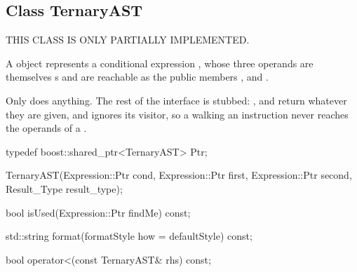 \subsection{Class TernaryAST}
\label{sec:TernaryAST}


THIS CLASS IS ONLY PARTIALLY IMPLEMENTED.

A  object represents a conditional expression
, whose three operands are themselves
s and are reachable as the public members ,
 and .

Only  does anything. The rest of the  interface
is stubbed: ,  and  return
 whatever they are given, and  ignores its visitor, so
a  walking an instruction never reaches the operands of a
.

\begin{apient}
  typedef boost::shared_ptr<TernaryAST> Ptr;
\end{apient}

\begin{apient}
  TernaryAST(Expression::Ptr cond,
             Expression::Ptr first,
             Expression::Ptr second,
             Result_Type result_type);
\end{apient}

\begin{apient}
  bool isUsed(Expression::Ptr findMe) const;
\end{apient}

\begin{apient}
  std::string format(formatStyle how = defaultStyle) const;
\end{apient}

\begin{apient}
  bool operator<(const TernaryAST& rhs) const;
\end{apient}



